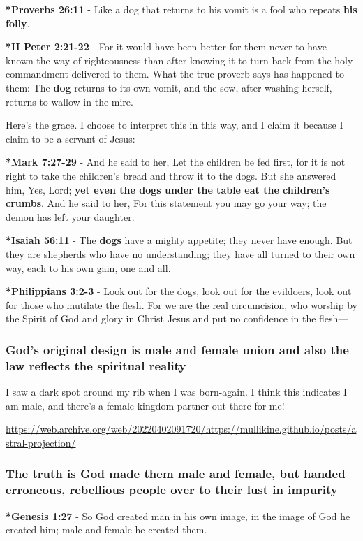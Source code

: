 \documentclass[11pt]{article}
\begin{document}
\textbf{*Proverbs 26:11} - Like a dog that returns to his vomit is a fool who repeats \textbf{his folly}.

\textbf{*II Peter 2:21-22} - For it would have been better for them never to have known the way of righteousness than after knowing it to turn back from the holy commandment delivered to them. What the true proverb says has happened to them: The \textbf{dog} returns to its own vomit, and the sow, after washing herself, returns to wallow in the mire.

Here's the grace. I choose to interpret this in this way, and I claim it because I claim to be a servant of Jesus:

\textbf{*Mark 7:27-29} - And he said to her, Let the children be fed first, for it is not right to take the children's bread and throw it to the dogs. But she answered him, Yes, Lord; \textbf{yet even the dogs under the table eat the children's crumbs}. \uline{And he said to her, For this statement you may go your way; the demon has left your daughter}.

\textbf{*Isaiah 56:11} - The \textbf{dogs} have a mighty appetite; they never have enough. But they are shepherds who have no understanding; \uline{they have all turned to their own way, each to his own gain, one and all}.

\textbf{*Philippians 3:2-3} - Look out for the \uline{dogs, look out for the evildoers}, look out for those who mutilate the flesh. For we are the real circumcision, who worship by the Spirit of God and glory in Christ Jesus and put no confidence in the flesh—

\subsubsection{God's original design is male and female union and also the law reflects the spiritual reality}
\label{sec:orgbe055d6}

I saw a dark spot around my rib when I was born-again.
I think this indicates I am male, and there's a female kingdom partner out there for me!

\url{https://web.archive.org/web/20220402091720/https://mullikine.github.io/posts/astral-projection/}

\subsubsection{The truth is God made them male and female, but handed erroneous, rebellious people over to their lust in impurity}
\label{sec:org6a4d417}
\textbf{*Genesis 1:27} - So God created man in his own image, in the image of God he created him; male and female he created them.
\end{document}
